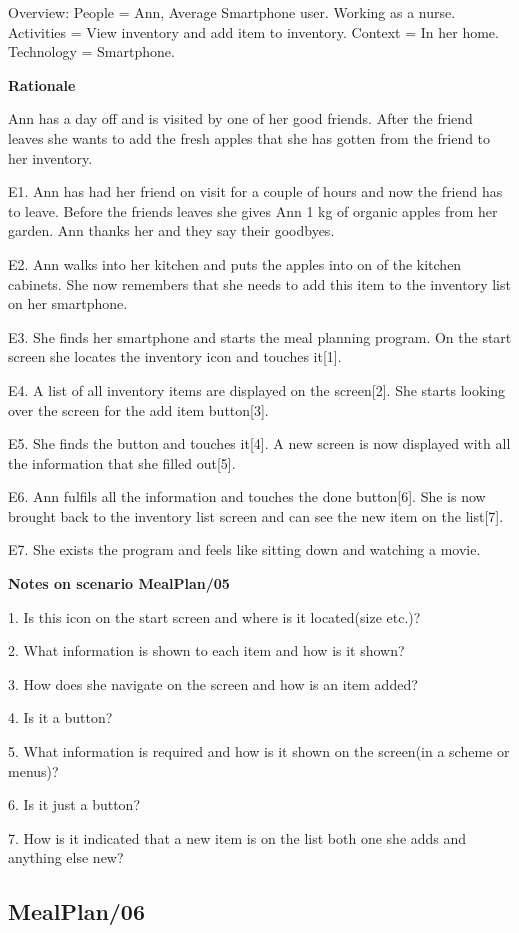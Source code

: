 Overview:
	People = Ann, Average Smartphone user. Working as a nurse.
	Activities = View inventory and add item to inventory.
	Context = In her home.
	Technology = Smartphone.

\textbf{Rationale}

Ann has a day off and is visited by one of her good friends. After the friend leaves she wants to add the fresh apples that she has gotten from the friend to her inventory.

	E1. Ann has had her friend on visit for a couple of hours and now the friend has to leave. Before the friends leaves she gives Ann 1 kg of organic apples from her garden. Ann thanks her and they say their goodbyes.

	E2. Ann walks into her kitchen and puts the apples into on of the kitchen cabinets. She now remembers that she needs to add this item to the inventory list on her smartphone.

	E3. She finds her smartphone and starts the meal planning program. On the start screen she locates the inventory icon and touches it[1].

	E4. A list of all inventory items are displayed on the screen[2]. She starts looking over the screen for the add item button[3].

	E5. She finds the button and touches it[4]. A new screen is now displayed with all the information that she filled out[5]. 

	E6. Ann fulfils all the information and touches the done button[6]. She is now brought back to the inventory list screen and can see the new item on the list[7].

	E7. She exists the program and feels like sitting down and watching a movie.

\textbf{Notes on scenario MealPlan/05}

1. Is this icon on the start screen and where is it located(size etc.)?

2. What information is shown to each item and how is it shown?

3. How does she navigate on the screen and how is an item added?

4. Is it a button?

5. What information is required and how is it shown on the screen(in a scheme or menus)?

6. Is it just a button?

7. How is it indicated that a new item is on the list both one she adds and anything else new?

\subsection{MealPlan/06} \label{MealPlan06}

